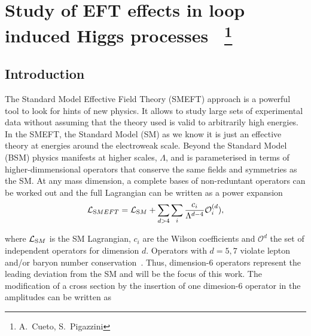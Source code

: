 \newcommand{\Herwig}{H\protect\scalebox{0.8}{ERWIG}\xspace}
\newcommand{\Pythia}{P\protect\scalebox{0.8}{YTHIA}\xspace}
\newcommand{\Sherpa}{S\protect\scalebox{0.8}{HERPA}\xspace}
\newcommand{\Rivet}{R\protect\scalebox{0.8}{IVET}\xspace}
\newcommand{\Professor}{P\protect\scalebox{0.8}{ROFESSOR}\xspace}
\newcommand{\eps}{\varepsilon}
\newcommand{\mc}[1]{\mathcal{#1}}
\newcommand{\mr}[1]{\mathrm{#1}}
\newcommand{\mb}[1]{\mathbb{#1}}
\newcommand{\tm}[1]{\scalebox{0.95}{$#1$}}

\section{Study of EFT effects in loop induced Higgs processes ~\protect\footnote{
  A.~Cueto,
  S.~Pigazzini}{}}

\label{sec:projname}



\subsection{Introduction}
\label{sec:higgseft:section1}
The Standard Model Effective Field Theory (SMEFT) approach is a powerful tool to look for hints of new physics. It allows to study large sets of experimental data without assuming that the theory used is valid to arbitrarily high energies. In the SMEFT, the Standard Model (SM) as we know it is just an effective theory at energies around the electroweak scale. Beyond the Standard Model (BSM) physics manifests at higher scales, $\Lambda$, and is parameterised in terms of higher-dimmensional operators that conserve the same fields and symmetries as the SM. At any mass dimension, a complete bases of non-reduntant operators can be worked out and the full Lagrangian can be written as a power expansion
\begin{equation}
\mathcal{L}_{\textrm SMEFT} = \mathcal{L}_{\textrm SM} + \sum_{d>4}\sum_{i}\frac{c_i}{\Lambda^{d-4}}\mathcal{O}_{i}^{(d}),
\end{equation}  

where $\mathcal{L}_{\textrm SM}$ is the SM Lagrangian, $c_i$ are the Wilson coefficients and ${\mathcal{O}^{d}}$ the set of independent operators for dimension $d$. Operators with $d=5,7$  violate lepton and/or baryon number conservation~\cite{Degrande:2012wf,Kobach:2016ami}. Thus, dimension-6 operators represent the leading deviation from the SM and will be the focus of this work. The modification of a cross section by the insertion of one dimesion-6 operator in the amplitudes can be written as

